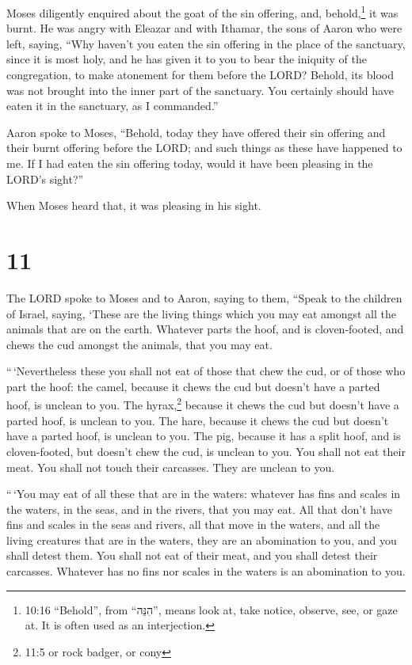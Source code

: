  Moses diligently enquired about the goat of the sin
offering, and, behold,\footnote{10:16 ``Behold'', from ``הִנֵּה'', means
  look at, take notice, observe, see, or gaze at. It is often used as an
  interjection.} it was burnt. He was angry with Eleazar and with
Ithamar, the sons of Aaron who were left, saying,  ``Why
haven't you eaten the sin offering in the place of the sanctuary, since
it is most holy, and he has given it to you to bear the iniquity of the
congregation, to make atonement for them before the LORD? 
Behold, its blood was not brought into the inner part of the sanctuary.
You certainly should have eaten it in the sanctuary, as I commanded.''

 Aaron spoke to Moses, ``Behold, today they have offered
their sin offering and their burnt offering before the LORD; and such
things as these have happened to me. If I had eaten the sin offering
today, would it have been pleasing in the LORD's sight?''

 When Moses heard that, it was pleasing in his sight.

\hypertarget{section-10}{%
\section{11}\label{section-10}}

 The LORD spoke to Moses and to Aaron, saying to them,
 ``Speak to the children of Israel, saying, `These are the
living things which you may eat amongst all the animals that are on the
earth.  Whatever parts the hoof, and is cloven-footed, and
chews the cud amongst the animals, that you may eat.

 ``\,`Nevertheless these you shall not eat of those that
chew the cud, or of those who part the hoof: the camel, because it chews
the cud but doesn't have a parted hoof, is unclean to you. 
The hyrax,\footnote{11:5 or rock badger, or cony} because it chews the
cud but doesn't have a parted hoof, is unclean to you.  The
hare, because it chews the cud but doesn't have a parted hoof, is
unclean to you.  The pig, because it has a split hoof, and
is cloven-footed, but doesn't chew the cud, is unclean to you.
 You shall not eat their meat. You shall not touch their
carcasses. They are unclean to you.

 ``\,`You may eat of all these that are in the waters:
whatever has fins and scales in the waters, in the seas, and in the
rivers, that you may eat.  All that don't have fins and
scales in the seas and rivers, all that move in the waters, and all the
living creatures that are in the waters, they are an abomination to you,
 and you shall detest them. You shall not eat of their
meat, and you shall detest their carcasses.  Whatever has
no fins nor scales in the waters is an abomination to you.

